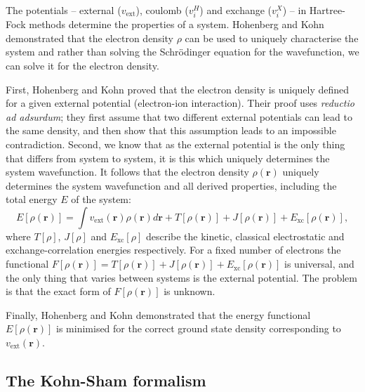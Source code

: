 The potentials -- external ($v_\mathrm{ext}$), coulomb ($v_i^H$) and exchange ($v_i^X$) -- in Hartree-Fock methods determine the properties of a system. Hohenberg and Kohn demonstrated that the electron density $\rho$ can be used to uniquely characterise the system and rather than solving the Schr\"{o}dinger equation for the wavefunction, we can solve it for the electron density.

First, Hohenberg and Kohn proved that the electron density is uniquely defined for a given external potential (electron-ion interaction). Their proof uses \textit{reductio ad adsurdum}; they first assume that two different external potentials can lead to the same density, and then show that this assumption leads to an impossible contradiction.\autocite{Burke2007} 
Second, we know that as the external potential is the only thing that differs from system to system, it is this which uniquely determines the system wavefunction. It follows that the electron density $\rho(\textbf{r})$ uniquely determines the system wavefunction and all derived properties, including the total energy $E$ of the system:\autocite{Kaxiras2007}
\begin{equation}
E\left[\rho(\textbf{r})\right]=\int v_{\textrm{ext}}(\textbf{r})\rho(\textbf{r})d\textbf{r}+T\left[\rho(\textbf{r})\right]+J\left[\rho(\textbf{r})\right]+E_{\textrm{xc}}\left[\rho(\textbf{r})\right],   
\end{equation}
where $T\left[\rho\right]$, $J\left[\rho\right]$ and $E_\textrm{xc}\left[\rho\right]$ describe the kinetic, classical electrostatic and exchange-correlation energies respectively. 
For a fixed number of electrons the functional $F\left[\rho(\textbf{r})\right]=T\left[\rho(\textbf{r})\right]+J\left[\rho(\textbf{r})\right]+E_{\textrm{xc}}\left[\rho(\textbf{r})\right]$ is universal, and the only thing that varies between systems is the external potential. The problem is that the exact form of $F\left[\rho(\textbf{r})\right]$ is unknown.

Finally, Hohenberg and Kohn demonstrated that the energy functional $E\left[\rho(\textbf{r})\right]$ is minimised for the correct ground state density corresponding to $v_\mathrm{ext}(\textbf{r})$.\autocite{Hohenberg1964}

\subsection{The Kohn-Sham formalism} 

